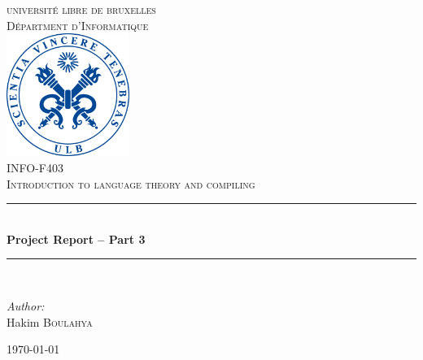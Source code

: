 \documentclass[letterpaper]{article}
\newcommand{\HRule}{\rule{\linewidth}{0.5mm}} %
\begin{document}
\begin{titlepage}
\begin{center}


\textsc{\LARGE universit\'e libre de bruxelles}\\[1.0cm]
\textsc{\Large D\'epartment d'Informatique}\\[1.5cm]

\includegraphics[width=0.3\textwidth]{image/ulblogo.jpg}~\\[1cm]

\textsc{
\large INFO-F403 \\
\Large  Introduction to language theory and compiling
 \\[1cm]}
\HRule \\[0.7cm]

{ \huge \bfseries Project Report – Part 3  \\[0.7cm] }

\HRule \\[2cm]

\noindent
\begin{center} \large

\emph{Author:}\\
\Large Hakim \textsc{Boulahya}\\
\end{center}
\begin{center} \large


\end{center}

\vfill

{\large \today}

\end{center}
\end{titlepage}

\tableofcontents
\newpage
\end{document}
